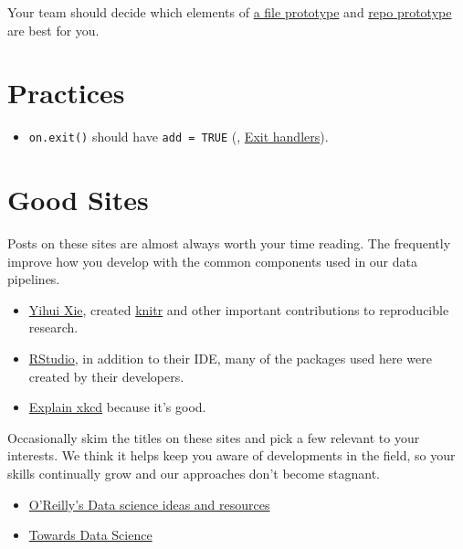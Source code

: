 \documentclass[
]{book}
\providecommand{\tightlist}{%
  \setlength{\itemsep}{0pt}\setlength{\parskip}{0pt}}
\begin{document}
\begin{enumerate}
  Your team should decide which elements of \href{https://ouhscbbmc.github.io/data-science-practices-1/file-prototype.html}{a file prototype} and \href{https://ouhscbbmc.github.io/data-science-practices-1/repo-prototype.html}{repo prototype} are best for you.
\end{enumerate}

\hypertarget{practices}{%
\section{Practices}\label{practices}}

\begin{itemize}
\tightlist
\item
  \texttt{on.exit()} should have \texttt{add\ =\ TRUE} (\citet{wickham-advanced-r}, \href{https://adv-r.hadley.nz/functions.html\#on-exit}{Exit handlers}).
\end{itemize}

\hypertarget{good-sites}{%
\section{Good Sites}\label{good-sites}}

Posts on these sites are almost always worth your time reading. The frequently improve how you develop with the common components used in our data pipelines.

\begin{itemize}
\tightlist
\item
  \href{https://yihui.org/en/}{Yihui Xie}, created \href{https://yihui.org/knitr/}{knitr} and other important contributions to reproducible research.
\item
  \href{https://blog.rstudio.com/}{RStudio}, in addition to their IDE, many of the packages used here were created by their developers.
\item
  \href{www.explainxkcd.com}{Explain xkcd} because it's good.
\end{itemize}

Occasionally skim the titles on these sites and pick a few relevant to your interests. We think it helps keep you aware of developments in the field, so your skills continually grow and our approaches don't become stagnant.

\begin{itemize}
\tightlist
\item
  \href{https://www.oreilly.com/topics/data-science}{O'Reilly's Data science ideas and resources}
\item
  \href{https://towardsdatascience.com/}{Towards Data Science}
\end{itemize}
\end{document}
